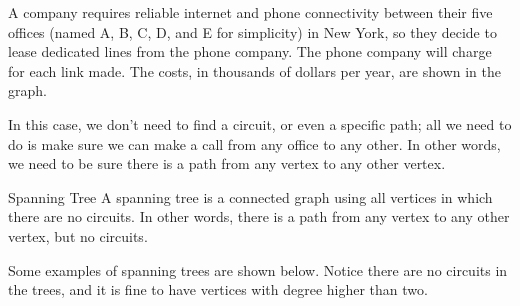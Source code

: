 A company requires reliable internet and phone connectivity between their five offices (named A, B, C, D, and E for simplicity) in New York, so they decide to lease dedicated lines from the phone company.  The phone company will charge for each link made.  The costs, in thousands of dollars per year, are shown in the graph.

\begin{center}
\end{center}

In this case, we don't need to find a circuit, or even a specific path; all we need to do is make sure we can make a call from any office to any other.  In other words, we need to be sure there is a path from any vertex to any other vertex.


\begin{definition}{Spanning Tree}{}
A spanning tree is a connected graph using all vertices in which there are no circuits.  
In other words, there is a path from any vertex to any other vertex, but no circuits.   
\end{definition}

Some examples of spanning trees are shown below.  Notice there are no circuits in the trees, and it is fine to have vertices with degree higher than two.\\

